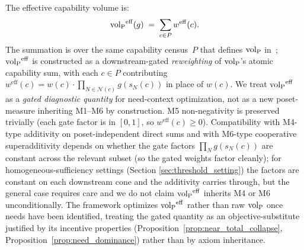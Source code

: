 \begin{definition}
The effective capability volume is:
\[
  {\operatorname{vol}_{\mathrm{P}}}^{\mathrm{eff}}(g) \;=\; \sum_{c \in P} w^{\mathrm{eff}}(c).
\]
The summation is over the same capability census~$P$ that
defines ${\operatorname{vol}_{\mathrm{P}}}$ in~\citep[Proposition~1]{lasser2026poset};
${\operatorname{vol}_{\mathrm{P}}}^{\mathrm{eff}}$ is constructed as a downstream-gated
\emph{reweighting} of ${\operatorname{vol}_{\mathrm{P}}}$'s atomic capability sum, with
each $c \in P$ contributing $w^{\mathrm{eff}}(c) = w(c) \cdot
\prod_{N \in \mathcal{N}(c)} g(s_N(c))$ in place of $w(c)$.
We treat ${\operatorname{vol}_{\mathrm{P}}}^{\mathrm{eff}}$ as a \emph{gated diagnostic
quantity} for need-context optimization, not as a new
poset-measure inheriting M1--M6 by construction.  M5
non-negativity is preserved trivially (each gate factor is in
$[0,1]$, so $w^{\mathrm{eff}}(c) \geq 0$).  Compatibility with
M4-type additivity on poset-independent direct sums and with
M6-type cooperative superadditivity depends on whether the
gate factors $\prod_N g(s_N(c))$ are constant across the
relevant subset (so the gated weights factor cleanly); for
homogeneous-sufficiency settings (Section
\ref{sec:threshold_setting}) the factors are constant on each
downstream cone and the additivity carries through, but the
general case requires care and we do not claim
${\operatorname{vol}_{\mathrm{P}}}^{\mathrm{eff}}$ inherits M4 or M6 unconditionally.  The
framework optimizes ${\operatorname{vol}_{\mathrm{P}}}^{\mathrm{eff}}$ rather than raw
${\operatorname{vol}_{\mathrm{P}}}$ once needs have been identified, treating the gated
quantity as an objective-substitute justified by its
incentive properties (Proposition~\ref{prop:near_total_collapse},
Proposition~\ref{prop:need_dominance}) rather than by axiom
inheritance.
\end{definition}

